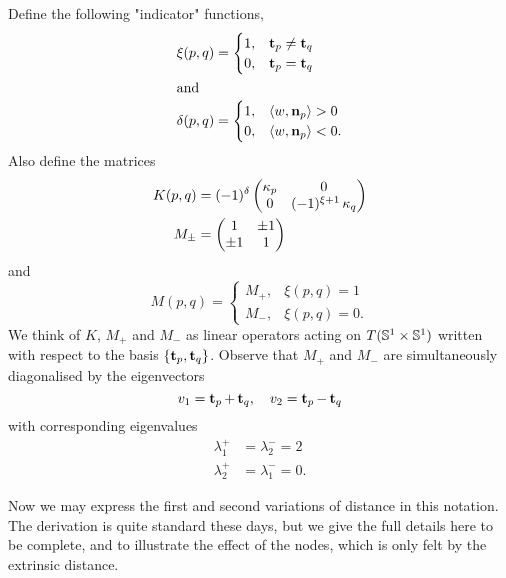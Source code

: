 \documentclass[11pt]{amsart}
\begin{document}
Define the following "indicator" functions,
\begin{align*}
\xi(p, q) &= \begin{cases}
1,& \operatorname{\mathbf{t}}_{p} \ne \operatorname{\mathbf{t}}_{q} \\
0,& \operatorname{\mathbf{t}}_{p} = \operatorname{\mathbf{t}}_{q}
\end{cases} \\
\intertext{and}
\delta(p, q) &= \begin{cases}
1,& \langle{w},{\operatorname{\mathbf{n}}_{p}}\rangle > 0 \\
0,& \langle{w},{\operatorname{\mathbf{n}}_{p}}\rangle < 0.
\end{cases}
\end{align*}
Also define the matrices
\begin{align*}
K(p,q) &= (-1)^{\delta}\begin{pmatrix}
\operatorname{\kappa}_{p} & 0 \\
0 & (-1)^{\xi +1} \operatorname{\kappa}_{q}
\end{pmatrix} \\
M_{\pm} &= \begin{pmatrix}
1 & \pm 1 \\
\pm 1 & 1 
\end{pmatrix}
\end{align*}
and
\[
M(p,q) = \begin{cases}
M_+,& \xi(p,q) = 1 \\
M_-,& \xi(p,q) = 0.
\end{cases}
\]
We think of \(K\), \(M_+\) and \(M_-\) as linear operators acting on \(T(\mathbb{S}^1\times\mathbb{S}^1)\) written with respect to the basis \(\{\operatorname{\mathbf{t}}_p, \operatorname{\mathbf{t}}_q\}\). Observe that \(M_+\) and \(M_-\) are simultaneously diagonalised by the eigenvectors 
\begin{equation}
\label{eq:eigenvectors}
v_1 = \operatorname{\mathbf{t}}_{p} + \operatorname{\mathbf{t}}_{q}, \quad v_2 = \operatorname{\mathbf{t}}_{p} - \operatorname{\mathbf{t}}_{q}
\end{equation}
with corresponding eigenvalues
\begin{equation}
\label{eq:eigenvalues}
\begin{split}
\lambda^+_1 &= \lambda^-_2 = 2 \\
\lambda^+_2 &= \lambda^-_1 = 0.
\end{split}
\end{equation} 

Now we may express the first and second variations of distance in this notation. The derivation is quite standard these days, but we give the full details here to be complete, and to illustrate the effect of the nodes, which is only felt by the extrinsic distance.
\end{document}
